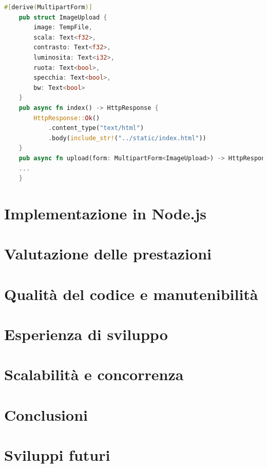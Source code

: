 \begin{lstlisting}[language=rust, label=lst:RustWasi, caption={Porzione del file main.rs}, showstringspaces=false]
    #[derive(MultipartForm)]
    pub struct ImageUpload {
        image: TempFile,
        scala: Text<f32>,
        contrasto: Text<f32>,
        luminosita: Text<i32>,
        ruota: Text<bool>,
        specchia: Text<bool>,
        bw: Text<bool>
    }
    pub async fn index() -> HttpResponse {
        HttpResponse::Ok()
            .content_type("text/html")
            .body(include_str!("../static/index.html"))
    }
    pub async fn upload(form: MultipartForm<ImageUpload>) -> HttpResponse {
    ...
    }
\end{lstlisting}


\newpage
\section{Implementazione in Node.js}

\section{Valutazione delle prestazioni}
\section{Qualità del codice e manutenibilità}
\section{Esperienza di sviluppo}
\section{Scalabilità e concorrenza}
\section{Conclusioni}
\section{Sviluppi futuri}